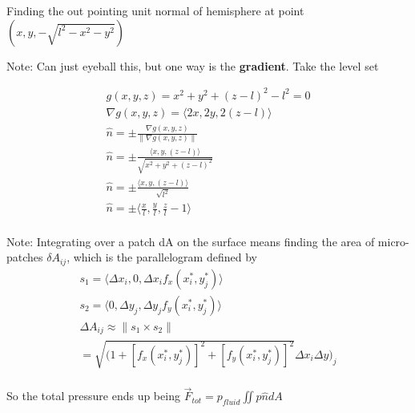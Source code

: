 \documentclass[11pt, oneside]{article}   	%
\begin{document}
Finding the out pointing unit normal of hemisphere at point $(x, y, -\sqrt{l^2-x^2-y^2})$

Note: Can just eyeball this, but one way is the \textbf{gradient}.  
Take the level set 


\begin{align}
g(x,y,z) = x^2  + y^2 + (z - l)^2 - l^2 = 0 \\
\nabla g(x,y,z) = \langle 2x , 2y , 2(z-l)  \rangle \\
\hat{n} = \pm \frac{\nabla g(x,y,z)}{ \|\nabla g(x,y,z) \|} \\ 
\hat{n} = \pm \frac{\langle x , y , (z-l)  \rangle}{\sqrt{x^2 + y^2 + (z-l)^2}} \\
\hat{n} = \pm \frac{\langle x , y , (z-l) \rangle}{\sqrt{l^2}} \\
\hat{n} = \pm \langle \frac{x}{l}, \frac{y}{l} ,\frac{z}{l} - 1\rangle \\
\end{align}


Note: Integrating over a patch dA on the surface means finding the area of micro-patches 
$\delta A_{ij}$, which is the parallelogram defined by 
\begin{align}
s_1 = \langle \Delta x_i, 0, \Delta x_i f_x(x_i^*,y_j^*) \rangle \\
s_2 = \langle 0, \Delta y_j, \Delta y_j f_y(x_i^*,y_j^*) \rangle \\ 
\Delta A_{ij} \approx \| s_1 \times s_2 \| \\ 
= \sqrt{ (1 + [ f_x(x_i^*,y_j^*)]^2 + [f_y(x_i^*,y_j^*)]^2 }\Delta x_i \Delta y)_j \\ 
\end{align}

So the total pressure ends up being $\overrightarrow{F}_{tot} = p_{fluid} \iint p  \hat{n}  dA$
\end{document}
